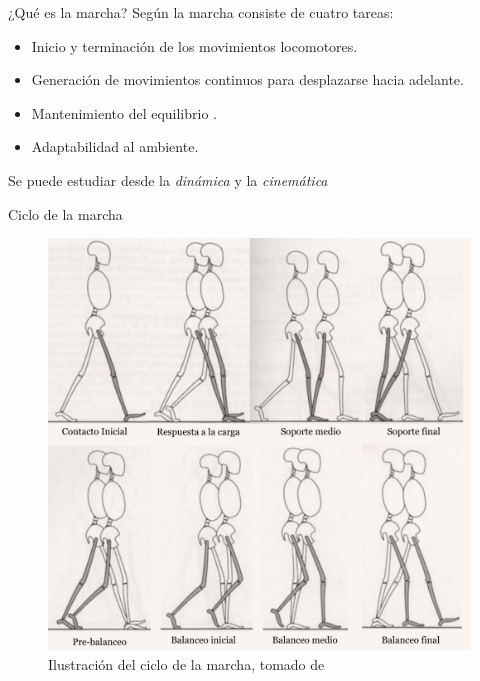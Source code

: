 \documentclass{beamer} %
\begin{document}
\begin{frame}{¿Qué es la marcha?}
    Según \citep{menz} la marcha consiste de cuatro tareas:
    \begin{itemize}
        \item Inicio y terminación de los movimientos locomotores.
        \item Generación de movimientos continuos para desplazarse hacia adelante.
        \item Mantenimiento del equilibrio .
        \item Adaptabilidad al ambiente. 
    \end{itemize}
    Se puede estudiar desde la \emph{dinámica} y la \emph{cinemática}
\end{frame}

\begin{frame}{Ciclo de la marcha}
    \begin{figure}
        \centering
        \includegraphics[height=0.7\textheight]{../report/imagenes/ciclo_marcha}
        \caption{Ilustración del ciclo de la marcha, tomado de \citep{perry}}
    \end{figure}
\end{frame}
\end{document}
